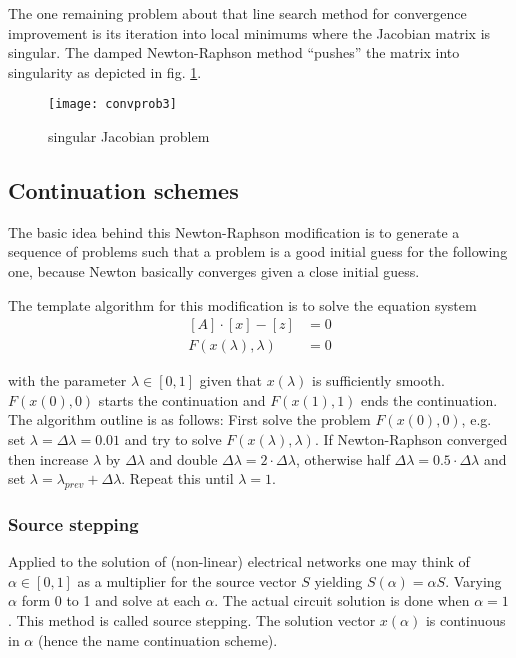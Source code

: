 The one remaining problem about that line search method for
convergence improvement is its iteration into local minimums where the
Jacobian matrix is singular.  The damped Newton-Raphson method
``pushes'' the matrix into singularity as depicted in
fig. \ref{fig:ConvProb3}.
\begin{figure}[ht]
\centering
\texttt{[image: convprob3]}
\caption{singular Jacobian problem}
\label{fig:ConvProb3}
\end{figure}
\FloatBarrier

\subsection{Continuation schemes}
\label{sec:continuation}

The basic idea behind this Newton-Raphson modification is to generate
a sequence of problems such that a problem is a good initial guess for
the following one, because Newton basically converges given a close
initial guess.

\addvspace{12pt}

The template algorithm for this modification is to solve the equation
system
\begin{align}
\left[A\right] \cdot \left[x\right] - \left[z\right] &= 0\\
F\left(x\left(\lambda\right), \lambda\right) &= 0
\end{align}

with the parameter $\lambda \in [0,1]$ given that
$x\left(\lambda\right)$ is sufficiently smooth.
$F\left(x\left(0\right), 0\right)$ starts the continuation and
$F\left(x\left(1\right), 1\right)$ ends the continuation.  The
algorithm outline is as follows: First solve the problem
$F\left(x\left(0\right), 0\right)$, e.g. set $\lambda = \Delta\lambda
= 0.01$ and try to solve $F\left(x\left(\lambda\right),
\lambda\right)$.  If Newton-Raphson converged then increase $\lambda$
by $\Delta\lambda$ and double $\Delta\lambda = 2\cdot \Delta\lambda$,
otherwise half $\Delta\lambda = 0.5\cdot \Delta\lambda$ and set
$\lambda = \lambda_{prev} + \Delta\lambda$.  Repeat this until
$\lambda = 1$.

\subsubsection{Source stepping}

Applied to the solution of (non-linear) electrical networks one may
think of $\alpha \in [0,1]$ as a multiplier for the source vector $S$
yielding $S\left(\alpha\right) = \alpha S$.  Varying $\alpha$ form 0
to 1 and solve at each $\alpha$.  The actual circuit solution is done
when $\alpha = 1$.  This method is called source stepping.  The
solution vector $x\left(\alpha\right)$ is continuous in $\alpha$
(hence the name continuation scheme).

